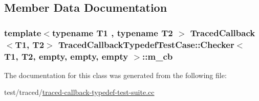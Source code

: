 \subsection{Member Data Documentation}
\subsubsection[{\texorpdfstring{m\+\_\+cb}{m_cb}}]{\setlength{\rightskip}{0pt plus 5cm}template$<$typename T1 , typename T2 $>$ {\bf Traced\+Callback}$<$T1, T2$>$ {\bf Traced\+Callback\+Typedef\+Test\+Case\+::\+Checker}$<$ T1, T2, {\bf empty}, {\bf empty}, {\bf empty} $>$\+::m\+\_\+cb\hspace{0.3cm}{\ttfamily [private]}}\hypertarget{classTracedCallbackTypedefTestCase_1_1Checker_3_01T1_00_01T2_00_01empty_00_01empty_00_01empty_01_4_a63fe47f1639c63a9e6b9d776a4befc65}{}\label{classTracedCallbackTypedefTestCase_1_1Checker_3_01T1_00_01T2_00_01empty_00_01empty_00_01empty_01_4_a63fe47f1639c63a9e6b9d776a4befc65}


The documentation for this class was generated from the following file\+:\begin{DoxyCompactItemize}
\item 
test/traced/\hyperlink{traced-callback-typedef-test-suite_8cc}{traced-\/callback-\/typedef-\/test-\/suite.\+cc}\end{DoxyCompactItemize}
